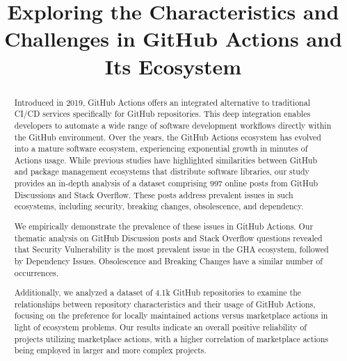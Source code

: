 \documentclass[conference]{IEEEtran}
\begin{document}
\title{Exploring the Characteristics and Challenges in GitHub Actions and Its Ecosystem\\}


\author{
\and
{}
}

\maketitle

\begin{abstract}
  Introduced in 2019, GitHub Actions offers an integrated alternative to traditional CI/CD services specifically for GitHub repositories. This deep integration enables developers to automate a wide range of software development workflows directly within the GitHub environment. Over the years, the GitHub Actions ecosystem has evolved into a mature software ecosystem, experiencing exponential growth in minutes of Actions usage. While previous studies have highlighted similarities between GitHub and package management ecosystems that distribute software libraries, our study provides an in-depth analysis of a dataset comprising 997 online posts from GitHub Discussions and Stack Overflow. These posts address prevalent issues in such ecosystems, including security, breaking changes, obsolescence, and dependency. 

  We empirically demonstrate the prevalence of these issues in GitHub Actions. Our thematic analysis on GitHub Discussion posts and Stack Overflow questions revealed that Security Vulnerability is the most prevalent issue in the GHA ecosystem, followed by Dependency Issues. Obsolescence and Breaking Changes have a similar number of occurrences. 

   Additionally, we analyzed a dataset of 4.1k GitHub repositories to examine the relationships between repository characteristics and their usage of GitHub Actions, focusing on the preference for locally maintained actions versus marketplace actions in light of ecosystem problems. Our results indicate an overall positive reliability of projects utilizing marketplace actions, with a higher correlation of marketplace actions being employed in larger and more complex projects. \\ 
 \end{abstract}
\end{document}
